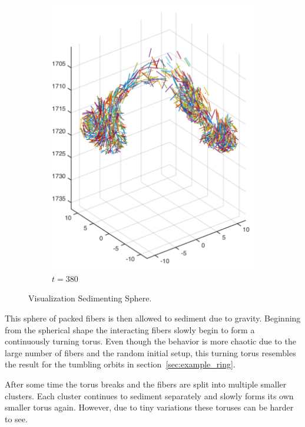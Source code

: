 \begin{figure}[!htbp]
\begin{subfigure}[h]{0.4\textwidth}
    \includegraphics[width=\textwidth]{img/state_00380.pdf}
    \caption{$t=380$}\label{fig:sphere_simulation_1d}
  \end{subfigure}
  \caption{Visualization Sedimenting Sphere.}
  \label{fig:sphere_simulation}
\end{figure}

This sphere of packed fibers is then allowed to sediment due to gravity. Beginning from the spherical shape the interacting fibers slowly begin to form a continuously turning torus. Even though the behavior is more chaotic due to the large number of fibers and the random initial setup, this turning torus resembles the result for the tumbling orbits in section~\ref{sec:example_ring}.

After some time the torus breaks and the fibers are split into multiple smaller clusters. Each cluster continues to sediment separately and slowly forms its own smaller torus again. However, due to tiny variations these toruses can be harder to see.

